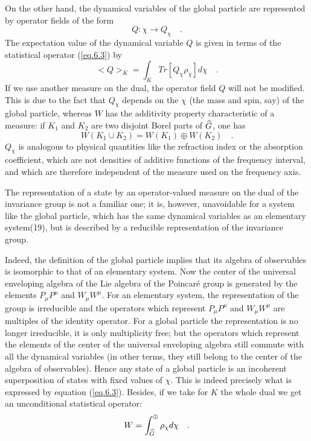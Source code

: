 \documentclass[a4paper,11pt]{article}
\begin{document}
On the other hand, the dynamical variables of the global particle are represented by 
operator fields of the form
$$
   Q : \chi \rightarrow Q_{\chi}  \quad .
$$
The expectation value of the dynamical variable $Q$ is given in terms of the statistical 
operator (\ref{eq.6.3}) by
\begin{equation}
 \label{eq.6.5}
    < Q >_K = \int_K Tr[Q_{\chi} \rho_{\chi} ] d\chi   \quad .
\end{equation}
If we use another measure on the dual, the operator field $Q$ will not be modified. This is due 
to the fact that $Q_{\chi}$ depends on the $\chi$ (the mass and spin, say) of the global 
particle, whereas $W$ 
has the additivity property characteristic of a measure: if $K_1$ and $K_2$ are two disjoint 
Borel parts of $\widehat{G}$, one has
$$
   W(K_1 \cup K_2) = W(K_1) \oplus W(K_2)  \quad .
$$
$Q_{\chi}$ is analogous to physical quantities like the refraction index or the absorption 
coefficient, 
which are not densities of additive functions of the frequency interval, and which are 
therefore independent of the measure used on the frequency axis. 

The representation of a state by an operator-valued measure on the dual of the invariance group 
is not a familiar one; it is, however, unavoidable for a system like the global particle, which 
has the same dynamical variables as an elementary system(19), but is described by a reducible 
representation of the invariance group. 

Indeed, the definition of the global particle implies that its algebra of observables is 
isomorphic to that of an elementary system. Now the center of the universal enveloping algebra 
of the Lie algebra of the Poincar\'e  group is generated by the elements $P_{\mu}P^{\mu}$ and 
$W_{\mu}W^{\mu}$. For an elementary system, the representation of the group is irreducible and 
the operators which represent $P_{\mu}P^{\mu}$ and $W_{\mu}W^{\mu}$ are multiples of the 
identity operator. For a global particle the representation is no longer irreducible, it is 
only multiplicity free; but the operators which 
represent the elements of the center of the universal enveloping algebra still commute with all 
the dynamical variables (in other terms, they still belong to the center of the algebra of 
observables). Hence any state of a global particle is an incoherent superposition of states 
with fixed values of $\chi$. This is indeed precisely what is expressed by equation 
(\ref{eq.6.3}). 
Besides, if we take for $K$ the whole dual we get an unconditional statistical operator:
\begin{equation}
 \label{eq.6.6}
       W = \int_{\widehat{G}}^{\oplus} \rho_{\chi} d\chi   \quad .
\end{equation}
\end{document}
